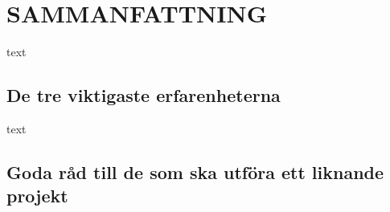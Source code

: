 \documentclass[efterstudie/studie.tex]{subfiles}
\begin{document}
\section{SAMMANFATTNING}
text
\subsection{De tre viktigaste erfarenheterna}
text

\subsection{Goda råd till de som ska utföra ett liknande projekt}
\end{document}
